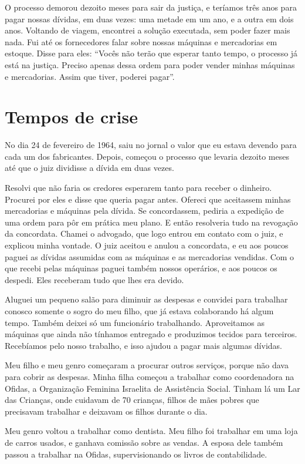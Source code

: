 O processo demorou dezoito meses para sair da justiça, e teríamos
três anos para pagar nossas dívidas, em duas vezes: uma metade em um ano, e a
outra em dois anos. Voltando de viagem, encontrei a solução executada, sem poder fazer mais nada. Fui até os fornecedores falar sobre nossas
máquinas e mercadorias em estoque. Disse para eles: ``Vocês não 
terão que esperar tanto tempo, o processo já está na justiça. Preciso apenas dessa ordem para poder vender minhas máquinas e mercadorias. Assim que tiver, 
poderei pagar''.

\chapter{Tempos de crise}

No dia 24 de fevereiro de 1964, saiu no jornal o valor que eu estava
devendo para cada um dos fabricantes. Depois, começou o processo que 
levaria dezoito meses até que o juiz dividisse a dívida em duas vezes.

Resolvi que não faria os credores esperarem tanto para receber
o dinheiro. Procurei por eles e disse que queria pagar antes. Ofereci que
aceitassem minhas mercadorias e máquinas pela dívida. Se concordassem, pediria a expedição de uma ordem para pôr em prática meu plano. E então resolveria tudo na revogação da
concordata. Chamei o advogado, que logo entrou em contato com o juiz, e explicou minha vontade. O juiz aceitou e anulou a concordata, e eu aos
poucos paguei as dívidas assumidas com as máquinas e as mercadorias vendidas.
Com o que recebi pelas máquinas paguei também nossos operários, e aos
poucos os despedi. Eles receberam tudo que lhes era devido. 

Aluguei um
pequeno salão para diminuir as despesas e convidei para trabalhar
conosco somente o sogro do
meu filho, que já estava colaborando há algum tempo. Também deixei só um funcionário trabalhando. Aproveitamos as
máquinas que ainda não tínhamos entregado e produzimos tecidos para
terceiros. Recebíamos pelo nosso trabalho, e isso ajudou a pagar mais
algumas dívidas.

Meu filho e meu genro começaram a procurar outros serviços, porque não
dava para cobrir as despesas. Minha filha começou a
trabalhar como coordenadora na Ofidas, a Organização Feminina Israelita de Assistência Social. Tinham lá um Lar das Crianças, onde cuidavam de 70 crianças, filhos de mães
pobres que precisavam trabalhar e deixavam os filhos durante o dia.

Meu genro voltou a trabalhar como dentista. Meu filho foi
trabalhar em uma loja de carros usados, e ganhava comissão sobre as
vendas. A esposa dele também passou a trabalhar na Ofidas,
supervisionando os livros de contabilidade.

